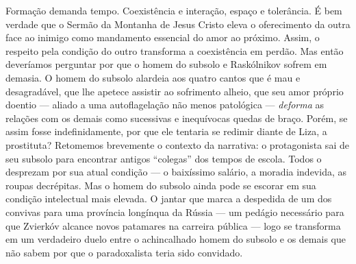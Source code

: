 Formação demanda tempo. Coexistência e interação, espaço e tolerância. É
bem verdade que o Sermão da Montanha de Jesus Cristo eleva o
oferecimento da outra face ao inimigo como mandamento essencial do amor
ao próximo. Assim, o respeito pela condição do outro transforma a
coexistência em perdão. Mas então deveríamos perguntar por que o homem
do subsolo e Raskólnikov sofrem em demasia. O homem do subsolo alardeia
aos quatro cantos que é mau e desagradável, que lhe apetece assistir ao
sofrimento alheio, que seu amor próprio doentio --- aliado a uma
autoflagelação não menos patológica --- \emph{deforma} as relações com os
demais como sucessivas e inequívocas quedas de braço. Porém, se assim
fosse indefinidamente, por que ele tentaria se redimir diante de Liza, a
prostituta? Retomemos brevemente o contexto da narrativa: o protagonista
sai de seu subsolo para encontrar antigos ``colegas'' dos tempos de
escola. Todos o desprezam por sua atual condição --- o baixíssimo
salário, a moradia indevida, as roupas decrépitas. Mas o homem do
subsolo ainda pode se escorar em sua condição intelectual mais elevada.
O jantar que marca a despedida de um dos convivas para uma província
longínqua da Rússia --- um pedágio necessário para que Zvierkóv alcance
novos patamares na carreira pública --- logo se transforma em um
verdadeiro duelo entre o achincalhado homem do subsolo e os demais que
não sabem por que o paradoxalista teria sido convidado.

